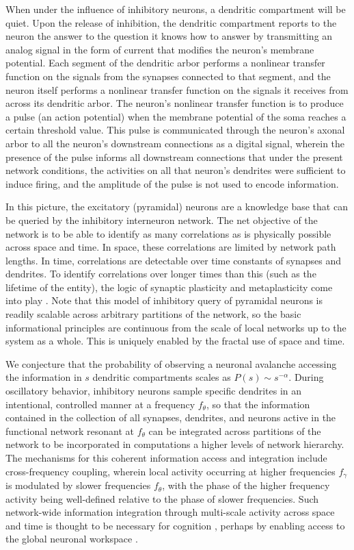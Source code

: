 \documentclass[twocolumn]{article}
\begin{document}
When under the influence of inhibitory neurons, a dendritic compartment will be quiet. Upon the release of inhibition, the dendritic compartment reports to the neuron the answer to the question it knows how to answer by transmitting an analog signal in the form of current that modifies the neuron's membrane potential. Each segment of the dendritic arbor performs a nonlinear transfer function on the signals from the synapses connected to that segment, and the neuron itself performs a nonlinear transfer function on the signals it receives from across its dendritic arbor. The neuron's nonlinear transfer function is to produce a pulse (an action potential) when the membrane potential of the soma reaches a certain threshold value. This pulse is communicated through the neuron's axonal arbor to all the neuron's downstream connections as a digital signal, wherein the presence of the pulse informs all downstream connections that under the present network conditions, the activities on all that neuron's dendrites were sufficient to induce firing, and the amplitude of the pulse is not used to encode information.

In this picture, the excitatory (pyramidal) neurons are a knowledge base that can be queried by the inhibitory interneuron network. The net objective of the network is to be able to identify as many correlations as is physically possible across space and time. In space, these correlations are limited by network path lengths. In time, correlations are detectable over time constants of synapses and dendrites. To identify correlations over longer times than this (such as the lifetime of the entity), the logic of synaptic plasticity and metaplasticity come into play \cite{fudr2005,fuab2007}. Note that this model of inhibitory query of pyramidal neurons is readily scalable across arbitrary partitions of the network, so the basic informational principles are continuous from the scale of local networks up to the system as a whole. This is uniquely enabled by the fractal use of space and time.

We conjecture that the probability of observing a neuronal avalanche accessing the information in $s$ dendritic compartments scales as $P(s)\sim s^{-\alpha}$. During oscillatory behavior, inhibitory neurons sample specific dendrites in an intentional, controlled manner at a frequency $f_{\theta}$, so that the information contained in the collection of all synapses, dendrites, and neurons active in the functional network resonant at $f_{\theta}$ can be integrated across partitions of the network to be incorporated in computations a higher levels of network hierarchy. The mechanisms for this coherent information access and integration include cross-frequency coupling, wherein local activity occurring at higher frequencies $f_{\gamma}$ is modulated by slower frequencies $f_{\theta}$, with the phase of the higher frequency activity being well-defined relative to the phase of slower frequencies. Such network-wide information integration through multi-scale activity across space and time is thought to be necessary for cognition \cite{bu2006}, perhaps by enabling access to the global neuronal workspace \cite{ba1988,de2014}.
\end{document}

